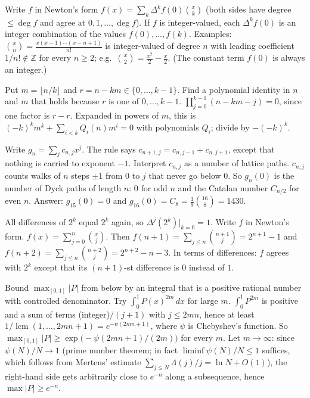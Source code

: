 \documentclass[11pt,a4paper]{article}
\begin{document}

 Write $f$ in Newton's form $f(x)=\sum_k\Delta^kf(0)\binom xk$ (both sides have degree $\le\deg f$ and agree at $0,1,\dots,\deg f$). If $f$ is integer-valued, each $\Delta^kf(0)$ is an integer combination of the values $f(0),\dots,f(k)$.
 Examples: $\binom xn=\frac{x(x-1)\cdots(x-n+1)}{n!}$ is integer-valued of degree $n$ with leading coefficient $1/n!\notin\mathbb{Z}$ for every $n\ge2$; e.g.\ $\binom x2=\frac{x^2}2-\frac x2$. (The constant term $f(0)$ is always an integer.)

 Put $m=\lfloor n/k\rfloor$ and $r=n-km\in\{0,\dots,k-1\}$. Find a polynomial identity in $n$ and $m$ that holds because $r$ is one of $0,\dots,k-1$.
 $\prod_{j=0}^{k-1}(n-km-j)=0$, since one factor is $r-r$. Expanded in powers of $m$, this is $(-k)^km^k+\sum_{i<k}Q_i(n)m^i=0$ with polynomials $Q_i$; divide by $-(-k)^k$.

 Write $g_n=\sum_jc_{n,j}x^j$. The rule says $c_{n+1,j}=c_{n,j-1}+c_{n,j+1}$, except that nothing is carried to exponent $-1$. Interpret $c_{n,j}$ as a number of lattice paths.
 $c_{n,j}$ counts walks of $n$ steps $\pm1$ from $0$ to $j$ that never go below $0$. So $g_n(0)$ is the number of Dyck paths of length $n$: $0$ for odd $n$ and the Catalan number $C_{n/2}$ for even $n$.
 Answer: $g_{15}(0)=0$ and $g_{16}(0)=C_8=\frac1{9}\binom{16}8=1430$.

 All differences of $2^k$ equal $2^k$ again, so $\Delta^j(2^k)\big|_{k=0}=1$. Write $f$ in Newton's form.
 $f(x)=\sum_{j=0}^n\binom xj$. Then $f(n+1)=\sum_{j\le n}\binom{n+1}j=2^{n+1}-1$ and $f(n+2)=\sum_{j\le n}\binom{n+2}j=2^{n+2}-n-3$. In terms of differences: $f$ agrees with $2^k$ except that its $(n+1)$-st difference is $0$ instead of $1$.

 Bound $\max_{[0,1]}|P|$ from below by an integral that is a positive rational number with controlled denominator. Try $\int_0^1P(x)^{2m}\,dx$ for large $m$.
 $\int_0^1P^{2m}$ is positive and a sum of terms (integer)$/(j+1)$ with $j\le2mn$, hence at least $1/\operatorname{lcm}(1,\dots,2mn+1)=e^{-\psi(2mn+1)}$, where $\psi$ is Chebyshev's function. So $\max_{[0,1]}|P|\ge\exp\bigl(-\psi(2mn+1)/(2m)\bigr)$ for every $m$.
 Let $m\to\infty$: since $\psi(N)/N\to1$ (prime number theorem; in fact $\liminf\psi(N)/N\le1$ suffices, which follows from Mertens' estimate $\sum_{j\le N}\Lambda(j)/j=\ln N+O(1)$), the right-hand side gets arbitrarily close to $e^{-n}$ along a subsequence, hence $\max|P|\ge e^{-n}$.
\end{document}
